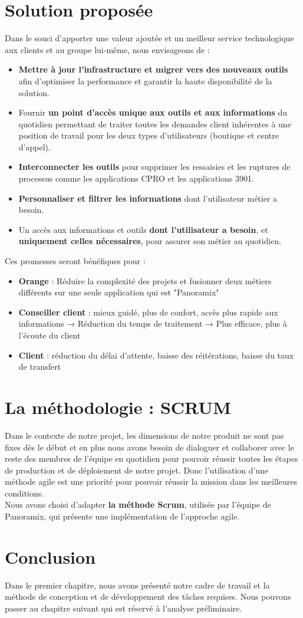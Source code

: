 \section[Solution proposée]{Solution proposée}
Dans le souci d’apporter une valeur ajoutée et un meilleur service technologique aux clients et au groupe lui-même, nous envisageons de :
\begin{itemize}
	\item \textbf{Mettre à jour l'infrastructure et migrer vers des nouveaux outils} afin d'optimiser la performance et garantir la haute disponibilité de la solution.
	\item Fournir \textbf{un point d’accès unique aux outils et aux informations} du quotidien permettant de traiter toutes les demandes client inhérentes à une position de travail pour les deux types d'utilisateurs (boutique et centre d’appel).
	\item \textbf{Interconnecter les outils} pour supprimer les ressaisies et les ruptures de processus comme les applications CPRO et les applications 3901.
	\item \textbf{Personnaliser et filtrer les informations} dont l’utilisateur métier a besoin.
	\item Un accès aux informations et outils \textbf{dont l’utilisateur a besoin}, et \textbf{uniquement celles nécessaires}, pour assurer son métier au quotidien.
	
\end{itemize}
Ces promesses seront bénéfiques pour :
\begin{itemize}
	\item \textbf{Orange} : Réduire la complexité des projets et fusionner deux métiers différents sur une seule application qui est "Panoramix" \\
	\item \textbf{Conseiller client } : mieux guidé, plus de confort, accès plus rapide aux informations
	\subitem → Réduction du temps  de traitement
	\subitem → Plus efficace, plus à l’écoute du client
	\item \textbf{Client} : réduction du délai d’attente, baisse des réitérations, baisse du taux de transfert
\end{itemize}
\section[La méthodologie : SCRUM]{La méthodologie : SCRUM}
Dans le contexte de notre projet, les dimensions de notre produit ne sont pas fixes dès le début et en plus nous avons besoin de dialoguer  et collaborer avec le reste des membres de l’équipe en quotidien pour pouvoir réussir toutes les étapes de production et de déploiement de notre projet. Donc l’utilisation d’une méthode agile est une priorité pour pouvoir réussir la mission dans les meilleures conditions. 
\\
Nous avons choisi d’adapter \textbf{la méthode Scrum}, utilisée par l’équipe de Panoramix, qui présente une implémentation de l’approche agile.
\section*{Conclusion}
Dans le premier chapitre, nous avons présenté notre cadre de travail et la méthode de conception et de développement des tâches requises. Nous pouvons passer au chapitre suivant qui est réservé à l’analyse préliminaire.